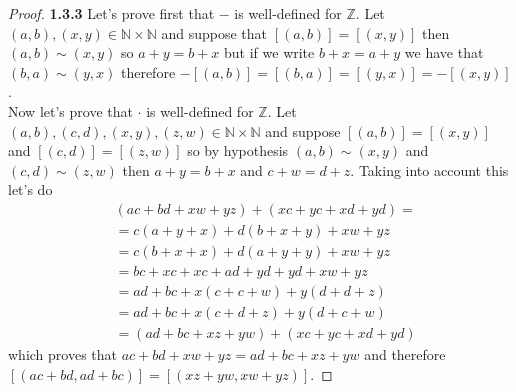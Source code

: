 \documentclass[11pt]{article}
\newcommand{\N}{\mathbb{N}}
\newcommand{\Z}{\mathbb{Z}}
\theoremstyle{definition}
\begin{document}
    \begin{proof}{\textbf{1.3.3}}
        Let's prove first that $-$ is well-defined for $\Z$. Let
        $(a,b),(x,y) \in \N \times \N$ and suppose that $[(a,b)] = [(x,y)]$ then
        $(a,b)\sim(x,y)$ so $a+y = b+x$ but if we write $b+x=a+y$ we have that
        $(b,a) \sim (y,x)$ therefore $-[(a,b)]=[(b,a)]=[(y,x)]=-[(x,y)]$.\\
        Now let's prove that $\cdot$ is well-defined for $\Z$. Let
        $(a,b),(c,d),(x,y),(z,w) \in \N \times \N$ and suppose $[(a,b)] = [(x,y)]$ and
        $[(c,d)] = [(z,w)]$ so by hypothesis $(a,b) \sim (x,y)$ and $(c,d) \sim (z,w)$
        then $a+y=b+x$ and $c+w=d+z$.
        Taking into account this let's do
        \begin{align*}
            &(ac + bd + xw + yz) + (xc + yc + xd + yd) = \\
            &= c(a + y + x) + d(b + x + y) + xw + yz \\
            &= c(b + x + x) + d(a + y + y) + xw + yz \\
            &= bc + xc + xc + ad + yd + yd + xw + yz \\
            &= ad + bc + x(c + c + w) + y(d + d + z) \\
            &= ad + bc + x(c + d + z) + y(d + c + w) \\
            &= (ad + bc + xz + yw) + (xc + yc + xd + yd)
        \end{align*}
        which proves that $ac + bd + xw + yz  = ad + bc + xz + yw$ and therefore
        $[(ac+bd,ad+bc)] = [(xz+yw,xw+yz)]$.
    \end{proof}
\end{document}
